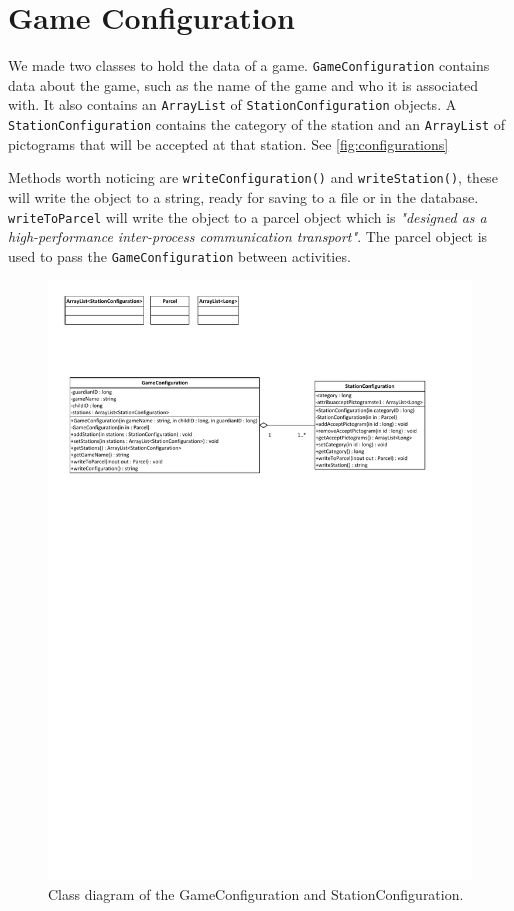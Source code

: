 \section{Game Configuration}
\label{gameconfiguration}
We made two classes to hold the data of a game. \lstinline|GameConfiguration| contains data about the game, such as the name of the game and who it is associated with. It also contains an \lstinline|ArrayList| of \lstinline|StationConfiguration| objects. A \lstinline|StationConfiguration| contains the category of the station and an \lstinline|ArrayList| of pictograms that will be accepted at that station. See \autoref{fig:configurations}

Methods worth noticing are \lstinline|writeConfiguration()| and \lstinline|writeStation()|, these will write the object to a string, ready for saving to a file or in the database. \lstinline|writeToParcel| will write the object to a parcel object which is \textit{"designed as a high-performance inter-process communication transport"}\citep{parcel}.
The parcel object is used to pass the \linebreak \lstinline|GameConfiguration| between activities.
\begin{figure}[H]
\includegraphics[width=1.0\linewidth,page=2]{img/configurations.pdf}%
\caption{Class diagram of the GameConfiguration and StationConfiguration.}
\label{fig:configurations}
\end{figure}

